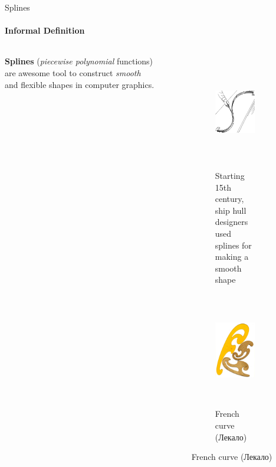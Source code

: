 \documentclass[aspectratio=169]{beamer}
\begin{document}
\begin{frame}[t]{Splines}
\framesubtitle{Informal Definition}
    \begin{columns}[T,onlytextwidth]
        \begin{column}{0.39\textwidth}
            \textbf{Splines} (\textit{piecewise polynomial} functions) are awesome tool to construct \textit{smooth} and flexible shapes in computer graphics.
        \end{column}
        \begin{column}{0.59\textwidth}
            \vspace{-1cm}
            \begin{figure}[H]
                \begin{subfigure}[b]{0.49\textwidth}
                    \centering\includegraphics[height=5cm,width=1\textwidth,keepaspectratio]{spline_ship.png}
                    \caption*{Starting 15th century, ship hull designers used splines for making a smooth shape}
                    \label{fig:spline_ship.png}
                \end{subfigure}
                \begin{subfigure}[b]{0.49\textwidth}
                    \centering\includegraphics[height=5cm,width=1\textwidth,keepaspectratio]{lekalo.jpg}
                    \caption*{French curve (Лекало)}
                    \label{fig:lekalo.jpg}
                \end{subfigure}
            \end{figure}
        \end{column}
    \end{columns}
\end{frame}
\end{document}
